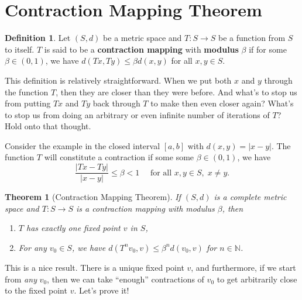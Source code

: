\documentclass[12pt]{article}
\newcommand{\N}{\mathbb{N}}
\newcommand{\abs}[1]{\left\vert{#1}\right\vert}
\newtheorem{theorem}{Theorem}
\theoremstyle{definition}
\newtheorem{definition}{Definition}
\begin{document}
\section{Contraction Mapping Theorem}

\begin{definition}
	Let $(S, d)$ be a metric space and $T:S \rightarrow S$ be a function from $S$ to itself. $T$ is said to be a \textbf{contraction mapping} with \textbf{modulus} $\beta$ if for some $\beta \in (0,1)$, we have $d(Tx, Ty) \leq \beta d(x,y)$ for all $x, y \in S$. 
\end{definition}

This definition is relatively straightforward. When we put both $x$ and $y$ through the function $T$, then they are closer than they were before. And what's to stop us from putting $Tx$ and $Ty$ back through $T$ to make then even closer again? What's to stop us from doing an arbitrary or even infinite number of iterations of $T$? Hold onto that thought. 

Consider the example in the closed interval $[a,b]$ with $d(x,y)=\abs{x-y}$. The function $T$ will constitute a contraction if some some $\beta \in (0,1)$, we have
	\[	\frac{\abs{Tx - Ty}}{\abs{x-y}} \leq \beta < 1 \quad \text{ for all } x,y \in S,\; x \neq y.\]	

\begin{theorem}[Contraction Mapping Theorem]
	If $(S,d)$ is a complete metric space and $T:S \rightarrow S$ is a contraction mapping with modulus $\beta$, then 
	\begin{enumerate}
		\item $T$ has exactly one fixed point $v$ in $S$,
		\item For any $v_0 \in S$, we have $d(T^nv_0,v) \leq \beta^n d(v_0, v)$ for $n \in \N$. 
	\end{enumerate}
\end{theorem}

This is a nice result. There is a unique fixed point $v$, and furthermore, if we start from \emph{any} $v_0$, then we can take ``enough'' contractions of $v_0$ to get arbitrarily close to the fixed point $v$. Let's prove it!
\end{document}
